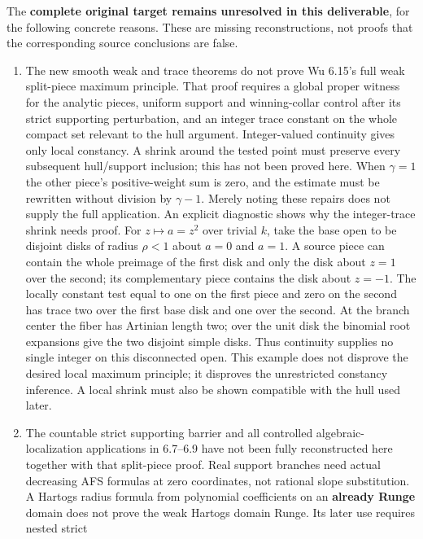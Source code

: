 \documentclass[
  10pt,
]{article}
\begin{document}
The \textbf{complete original target remains unresolved in this
deliverable}, for the following concrete reasons. These are missing
reconstructions, not proofs that the corresponding source conclusions
are false.

\begin{enumerate}
\def\labelenumi{\arabic{enumi}.}
\item
  The new smooth weak and trace theorems do not prove Wu 6.15's full
  weak split-piece maximum principle. That proof requires a global
  proper witness for the analytic pieces, uniform support and
  winning-collar control after its strict supporting perturbation, and
  an integer trace constant on the whole compact set relevant to the
  hull argument. Integer-valued continuity gives only local constancy. A
  shrink around the tested point must preserve every subsequent
  hull/support inclusion; this has not been proved here. When
  \(\gamma=1\) the other piece's positive-weight sum is zero, and the
  estimate must be rewritten without division by \(\gamma-1\). Merely
  noting these repairs does not supply the full application. An explicit
  diagnostic shows why the integer-trace shrink needs proof. For
  \(z\mapsto a=z^2\) over trivial \(k\), take the base open to be
  disjoint disks of radius \(\rho<1\) about \(a=0\) and \(a=1\). A
  source piece can contain the whole preimage of the first disk and only
  the disk about \(z=1\) over the second; its complementary piece
  contains the disk about \(z=-1\). The locally constant test equal to
  one on the first piece and zero on the second has trace two over the
  first base disk and one over the second. At the branch center the
  fiber has Artinian length two; over the unit disk the binomial root
  expansions give the two disjoint simple disks. Thus continuity
  supplies no single integer on this disconnected open. This example
  does not disprove the desired local maximum principle; it disproves
  the unrestricted constancy inference. A local shrink must also be
  shown compatible with the hull used later.
\item
  The countable strict supporting barrier and all controlled
  algebraic-localization applications in 6.7--6.9 have not been fully
  reconstructed here together with that split-piece proof. Real support
  branches need actual decreasing AFS formulas at zero coordinates, not
  rational slope substitution. A Hartogs radius formula from polynomial
  coefficients on an \textbf{already Runge} domain does not prove the
  weak Hartogs domain Runge. Its later use requires nested strict

\end{enumerate}
\end{document}
